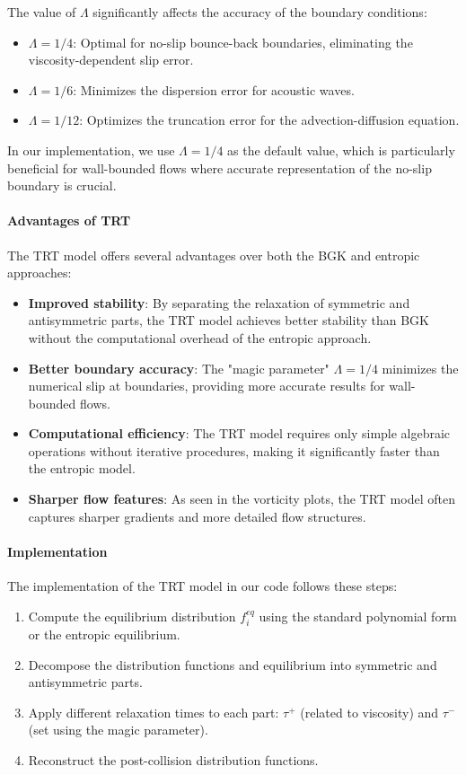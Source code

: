 \documentclass[12pt,a4paper]{article}
\begin{document}
The value of $\Lambda$ significantly affects the accuracy of the boundary conditions:
\begin{itemize}
    \item $\Lambda = 1/4$: Optimal for no-slip bounce-back boundaries, eliminating the viscosity-dependent slip error.
    \item $\Lambda = 1/6$: Minimizes the dispersion error for acoustic waves.
    \item $\Lambda = 1/12$: Optimizes the truncation error for the advection-diffusion equation.
\end{itemize}

In our implementation, we use $\Lambda = 1/4$ as the default value, which is particularly beneficial for wall-bounded flows where accurate representation of the no-slip boundary is crucial.

\paragraph{Advantages of TRT}
The TRT model offers several advantages over both the BGK and entropic approaches:
\begin{itemize}
    \item \textbf{Improved stability}: By separating the relaxation of symmetric and antisymmetric parts, the TRT model achieves better stability than BGK without the computational overhead of the entropic approach.
    \item \textbf{Better boundary accuracy}: The "magic parameter" $\Lambda = 1/4$ minimizes the numerical slip at boundaries, providing more accurate results for wall-bounded flows.
    \item \textbf{Computational efficiency}: The TRT model requires only simple algebraic operations without iterative procedures, making it significantly faster than the entropic model.
    \item \textbf{Sharper flow features}: As seen in the vorticity plots, the TRT model often captures sharper gradients and more detailed flow structures.
\end{itemize}

\paragraph{Implementation}
The implementation of the TRT model in our code follows these steps:
\begin{enumerate}
    \item Compute the equilibrium distribution $f_i^{eq}$ using the standard polynomial form or the entropic equilibrium.
    \item Decompose the distribution functions and equilibrium into symmetric and antisymmetric parts.
    \item Apply different relaxation times to each part: $\tau^+$ (related to viscosity) and $\tau^-$ (set using the magic parameter).
    \item Reconstruct the post-collision distribution functions.
\end{enumerate}
\end{document}
